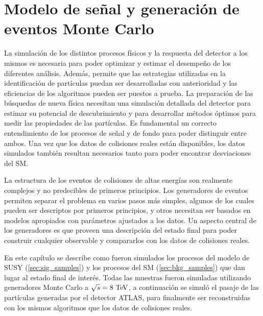 \chapter{Modelo de señal y generación de eventos Monte Carlo}
\label{cap:simulaciones}

La simulación de los distintos procesos físicos y la respuesta del detector a
los mismos es necesaria para poder optimizar y estimar el desempeño de los
diferentes análisis. Además, permite que las estrategias utilizadas en la
identificación de partículas puedan ser desarrolladas con anterioridad y las
eficiencias de los algoritmos pueden ser puestos a prueba. La preparación de las
búsquedas de nueva física necesitan una simulación detallada del detector para
estimar su potencial de descubrimiento y para desarrollar métodos óptimos para medir las
propiedades de las partículas. Es fundamental un correcto entendimiento de los
procesos de señal y de fondo para poder distinguir entre ambos. Una vez que los
datos de colisiones reales están disponibles, los datos simulados también
resultan necesarios tanto para poder encontrar desviaciones del SM.

La estructura de los eventos de colisiones de altas energías son realmente
complejos y no predecibles de primeros principios. Los generadores de eventos
permiten separar el problema en varios pasos más simples, algunos de los cuales
pueden ser descriptos por primeros principios, y otros necesitan ser basados en
modelos apropiados con parámetros ajustados a los datos. Un aspecto central de
los generadores es que proveen una descripción del estado final para
poder construir cualquier observable y compararlos con los datos de colisiones
reales.

En este capítulo se describe como fueron simulados los procesos del modelo de
SUSY (\cref{sec:sig_samples}) y los procesos del SM (\cref{sec:bkg_samples}) que
dan lugar al estado final de interés. Todas las muestras fueron simuladas
utilizando generadores Monte Carlo a $\sqrt{s}=8\tev$, a continuación se simuló
el pasaje de las partículas generadas por el detector ATLAS, para finalmente ser
reconstruidas con los mismos algoritmos que los datos de colisiones reales.






